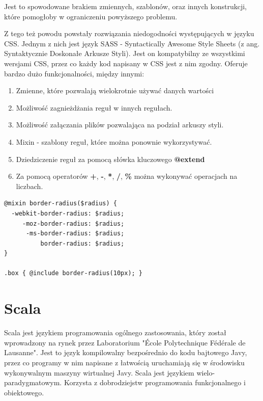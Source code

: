 Jest to spowodowane brakiem zmiennych, szablonów, oraz innych konstrukcji, które pomogłoby w ograniczeniu powyższego problemu. 

Z tego też powodu powstały rozwiązania niedogodności występujących w języku CSS. Jednym z nich jest język SASS - Syntactically Awesome Style Sheets (z ang. Syntaktycznie Doskonałe Arkusze Styli)\cite{Sass}. Jest on kompatybilny ze wszystkimi wersjami CSS, przez co każdy kod napisany w CSS jest z nim zgodny. Oferuje bardzo dużo funkcjonalności, między innymi:
\begin{enumerate}
	\item Zmienne, które pozwalają wielokrotnie używać danych wartości
	\item Możliwość zagnieżdżania reguł w innych regułach.
	\item Możliwość załączania plików pozwalająca na podział arkuszy styli.
	\item Mixin - szablony reguł, które można ponownie wykorzystywać.
	\item Dziedziczenie reguł za pomocą słówka kluczowego \textbf{@extend}
	\item Za pomocą operatorów \textbf{+}, \textbf{-}, \textbf{*}, \textbf{/}, \textbf{\%} można wykonywać operacjach na liczbach.
\end{enumerate}


\begin{lstlisting}[frame=single, numbers=none,captionpos=b, 
caption={Przykładowy kod SASS wykorzystujący mixin.}]
@mixin border-radius($radius) {
  -webkit-border-radius: $radius;
     -moz-border-radius: $radius;
      -ms-border-radius: $radius;
          border-radius: $radius;
}

.box { @include border-radius(10px); }
\end{lstlisting}

\newpage
{\let\cleardoublepage\relax \chapter{Scala}}

Scala\cite{ScalaWiki} jest językiem programowania ogólnego zastosowania, który został wprowadzony na rynek przez Laboratorium "École Polytechnique Fédérale de Lausanne". Jest to język kompilowalny bezpośrednio do kodu bajtowego Javy, przez co programy w nim napisane z łatwością uruchamiają się w środowisku wykonywalnym maszyny wirtualnej Javy. 
Scala jest językiem wielo-paradygmatowym\cite{ScalaTour}. Korzysta z dobrodziejstw programowania funkcjonalnego i obiektowego.


